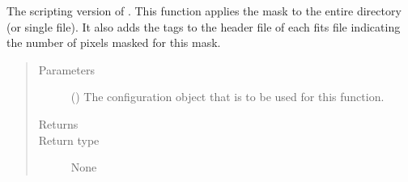 \documentclass[letterpaper,10pt,english]{sphinxmanual}
\begin{document}

\begin{fulllineitems}
\label{\detokenize{docstrings/ifa_smeargle.masking.scripting:ifa_smeargle.masking.scripting.script_mask_single_pixels}}
The scripting version of . This function
applies the mask to the entire directory (or single file). It
also adds the tags to the header file of each fits file
indicating the number of pixels masked for this mask.
\begin{quote}\begin{description}
\item[{Parameters}] \leavevmode
{} () \textendash{} The configuration object that is to be used for this
function.

\item[{Returns}] \leavevmode


\item[{Return type}] \leavevmode
None

\end{description}\end{quote}

\end{fulllineitems}

\end{document}
